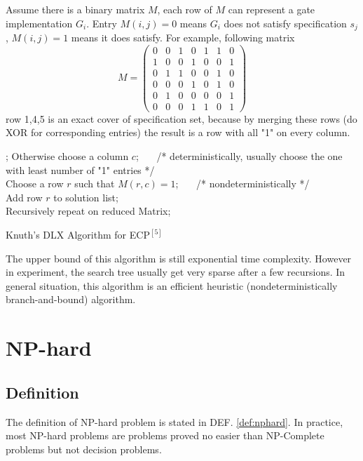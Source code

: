\documentclass[11pt,twoside, onecolumn]{IEEEtran}
\begin{document}
Assume there is a binary matrix $M$, each row of $M$ can represent a gate implementation $G_i$.
Entry $M(i,j) = 0$ means $G_i$ does not satisfy specification $s_j$, $M(i,j) = 1$ means it does satisfy.
For example, following matrix
\begin{equation}
M = \left(
\begin{array}{lcccccr}
0 & 0 & 1 & 0 & 1 & 1 & 0\\
1 & 0 & 0 & 1 & 0 & 0 & 1\\
0 & 1 & 1 & 0 & 0 & 1 & 0\\
0 & 0 & 0 & 1 & 0 & 1 & 0\\
0 & 1 & 0 & 0 & 0 & 0 & 1\\
0 & 0 & 0 & 1 & 1 & 0 & 1
\end{array}
\right)\nonumber
\end{equation}
row 1,4,5 is an exact cover of specification set, because by merging these rows (do XOR for corresponding
entries) the result is a row with all "1" on every column.

\begin{algorithm}[hbt]
\SetAlgoNoLine
  {
  		;
  	}
  Otherwise choose a column $c$; \ \ \ /* deterministically, usually choose the one with least number of "1" entries */\\
  Choose a row $r$ such that $M(r,c) = 1$; \ \ \ /* nondeterministically */ \\
  Add row $r$ to solution list;\\
   Recursively repeat on reduced Matrix;
\caption{Knuth's DLX Algorithm for ECP$^{[5]}$}\label{alg:knuth}
\end{algorithm}

The upper bound of this algorithm is still exponential time complexity. However in experiment,
the search tree usually get very sparse after a few recursions. In general situation, this algorithm
is an efficient heuristic (nondeterministically branch-and-bound) algorithm.

\section{NP-hard}
\subsection{Definition}
The definition of NP-hard problem is stated in DEF. \ref{def:nphard}. In practice, most NP-hard problems
are problems proved no easier than NP-Complete problems but not decision problems.
\end{document}
